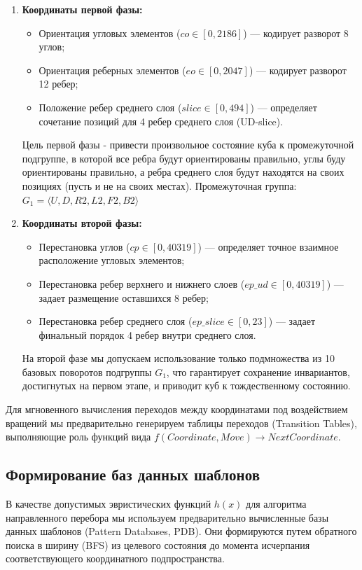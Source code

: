 \documentclass{article}
\begin{document}
\begin{enumerate}
    \item \textbf{Координаты первой фазы:}
    \begin{itemize}
        \item Ориентация угловых элементов ($co \in [0, 2186]$) — кодирует разворот 8 углов;
        \item Ориентация реберных элементов ($eo \in [0, 2047]$) — кодирует разворот 12 ребер;
        \item Положение ребер среднего слоя ($slice \in [0, 494]$) — определяет сочетание позиций для 4 ребер среднего слоя (UD-slice).
    \end{itemize}
    Цель первой фазы - привести произвольное состояние куба к промежуточной подгруппе, в которой все ребра будут ориентированы правильно, углы буду ориентированы правильно, а ребра среднего слоя будут находятся на своих позициях (пусть и не на своих местах). Промежуточная группа: $G_1 = \langle U, D, R2, L2, F2, B2 \rangle$
    
    \item \textbf{Координаты второй фазы:}
    \begin{itemize}
        \item Перестановка углов ($cp \in [0, 40319]$) — определяет точное взаимное расположение угловых элементов;
        \item Перестановка ребер верхнего и нижнего слоев ($ep\_ud \in [0, 40319]$) — задает размещение оставшихся 8 ребер;
        \item Перестановка ребер среднего слоя ($ep\_slice \in [0, 23]$) — задает финальный порядок 4 ребер внутри среднего слоя.
    \end{itemize}
    На второй фазе мы допускаем использование только подмножества из 10 базовых поворотов подгруппы $G_1$, что гарантирует сохранение инвариантов, достигнутых на первом этапе, и приводит куб к тождественному состоянию.
\end{enumerate}

Для мгновенного вычисления переходов между координатами под воздействием вращений мы предварительно генерируем таблицы переходов (Transition Tables), выполняющие роль функций вида $f(Coordinate, Move) \to NextCoordinate$.

\subsection{Формирование баз данных шаблонов}
В качестве допустимых эвристических функций $h(x)$ для алгоритма направленного перебора мы используем предварительно вычисленные базы данных шаблонов (Pattern Databases, PDB). Они формируются путем обратного поиска в ширину (BFS) из целевого состояния до момента исчерпания соответствующего координатного подпространства. 
\end{document}

